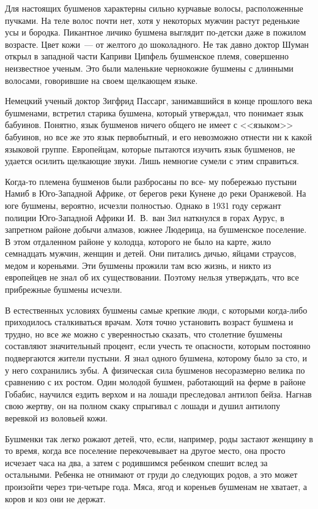 \documentclass[12pt,a4paper,twoside,openany,svgnames]{memoir}
\begin{document}
Для настоящих бушменов характерны сильно курчавые волосы, расположенные пучками. На теле волос почти нет, хотя у некоторых мужчин растут реденькие усы и бородка. Пикантное личико бушмена выглядит по-детски даже в пожилом возрасте. Цвет кожи~--- от желтого до шоколадного. Не так давно доктор Шуман открыл в западной части Каприви Ципфель бушменское племя, совершенно неизвестное ученым. Это были маленькие чернокожие бушмены с длинными волосами, говорившие на своем щелкающем языке.

Немецкий ученый доктор Зигфрид Пассарг, занимавшийся в конце прошлого века бушменами, встретил старика бушмена, который утверждал, что понимает язык бабуинов. Понятно, язык бушменов ничего общего не имеет с <<языком>> бабуинов, но все же это язык первобытный, и его невозможно отнести ни к какой языковой группе. Европейцам, которые пытаются изучить язык бушменов, не удается осилить щелкающие звуки. Лишь немногие сумели с этим справиться.

Когда-то племена бушменов были разбросаны по все- му побережью пустыни Намиб в Юго-Западной Африке, от берегов реки Кунене до реки Оранжевой. На юге бушмены, вероятно, исчезли полностью. Однако в 1931 году сержант полиции Юго-Западной Африки И.~В.~ван Зил наткнулся в горах Аурус, в запретном районе добычи алмазов, южнее Людерица, на бушменское поселение. В этом отдаленном районе у колодца, которого не было на карте, жило семнадцать мужчин, женщин и детей. Они питались дичью, яйцами страусов, медом и кореньями. Эти бушмены прожили там всю жизнь, и никто из европейцев не знал об их существовании. Поэтому нельзя утверждать, что все прибрежные бушмены исчезли.

В естественных условиях бушмены самые крепкие люди, с которыми когда-либо приходилось сталкиваться врачам. Хотя точно установить возраст бушмена и трудно, но все же можно с уверенностью сказать, что столетние бушмены составляют значительный процент, если учесть те опасности, которым постоянно подвергаются жители пустыни. Я знал одного бушмена, которому было за сто, и у него сохранились зубы. А физическая сила бушменов несоразмерно велика по сравнению с их ростом. Один молодой бушмен, работающий на ферме в районе Гобабис, научился ездить верхом и на лошади преследовал антилоп бейза. Нагнав свою жертву, он на полном скаку спрыгивал с лошади и душил антилопу веревкой из воловьей кожи.

Бушменки так легко рожают детей, что, если, например, роды застают женщину в то время, когда все поселение перекочевывает на другое место, она просто исчезает часа на два, а затем с родившимся ребенком спешит вслед за остальными. Ребенка не отнимают от груди до следующих родов, а это может произойти через три-четыре года. Мяса, ягод и кореньев бушменам не хватает, а коров и коз они не держат.
\end{document}

